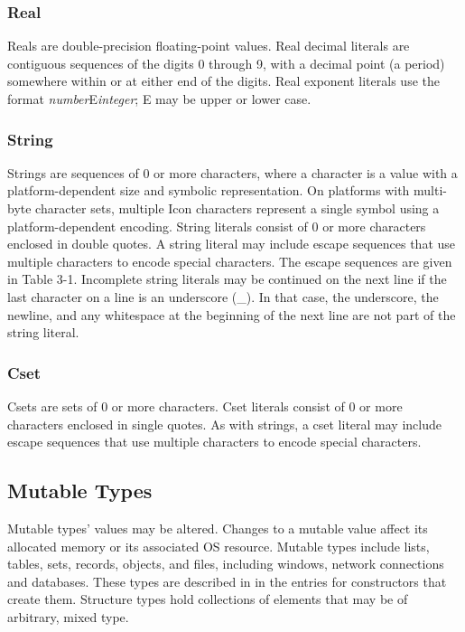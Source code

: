\subsubsection{Real}

Reals are double-precision floating-point values.
Real decimal literals are contiguous sequences of the digits 0 through
9, with a decimal point (a period) somewhere within or at either end of
the digits. Real exponent literals use the format
\textit{number}E\textit{integer}; E may be upper or lower case.

\subsubsection[String]{String}

Strings are sequences of 0 or more characters, where a
character is a value with a platform-dependent size and symbolic
representation. On platforms with multi-byte character sets, multiple
Icon characters represent a single symbol using a platform-dependent
encoding.
String literals consist of 0 or more characters enclosed in double
quotes. A string literal may include escape sequences that use multiple
characters to encode special characters. The escape sequences are given
in Table 3-1. Incomplete string literals may
be continued on the next line if the last character on a line is an
underscore (\_). In that case, the underscore, the newline, and any
whitespace at the beginning of the next line are not part of the string
literal.

\subsubsection[Cset]{Cset}

Csets are sets of 0 or more characters. Cset literals
consist of 0 or more characters enclosed in single quotes. As with
strings, a cset literal may include escape
sequences that use multiple characters to encode special characters.

\subsection{Mutable Types}

Mutable types' values may be altered. Changes to a
mutable value affect its allocated memory or its
associated OS resource. Mutable types include lists, tables,
sets, records, objects, and files, including windows, network
connections and databases. These types are described in
in the entries for constructors that
create them. Structure types hold
collections of elements that may be of arbitrary, mixed type.

